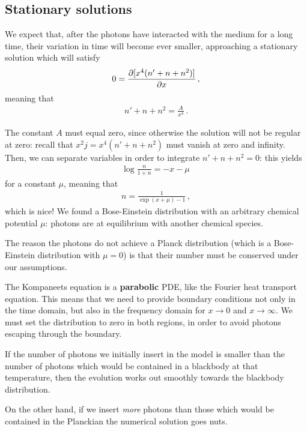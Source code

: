 \documentclass[main.tex]{subfiles}
\begin{document}
\subsection{Stationary solutions}

We expect that, after the photons have interacted with the medium for a long time, their variation in time will become ever smaller, approaching a stationary solution which will satisfy 
%
\begin{align}
0= \pdv{[x^{4} (n' + n + n^2)]}{x}
\,,
\end{align}
%
meaning that 
%
\begin{align}
n' + n + n^2 = \frac{A}{x^{4}}
\,.
\end{align}

The constant \(A\) must equal zero, since otherwise the solution will not be regular at zero: recall that \(x^2 j = x^{4 }( n' + n +n^2)\) must vanish at zero and infinity. 
Then, we can separate variables in order to integrate \(n' + n + n^2 = 0\): this yields 
%
\begin{align}
\log \frac{n}{1 + n} = - x - \mu    
\,
\end{align}
%
for a constant \(\mu \),
meaning that    
%
\begin{align}
n = \frac{1}{ \exp( x + \mu ) - 1}
\,,
\end{align}
%
which is nice!
We found a Bose-Einstein distribution with an arbitrary chemical potential \(\mu \): photons are at equilibrium with another chemical species. 

The reason the photons do not achieve a Planck distribution (which is a Bose-Einstein distribution with \(\mu = 0\)) is that their number must be conserved under our assumptions. 


The Kompaneets equation is a \textbf{parabolic} PDE, like the Fourier heat transport equation. 
This means that we need to provide boundary conditions not only in the time domain, but also in the frequency domain for \(x \to 0\) and \(x \to \infty \). We must set the distribution to zero in both regions, in order to avoid photons escaping through the boundary. 

If the number of photons we initially insert in the model is smaller than the number of photons which would be contained in a blackbody at that temperature, then the evolution works out smoothly towards the blackbody distribution.

On the other hand, if we insert \emph{more} photons than those which would be contained in the Planckian the numerical solution goes nuts. 
\end{document}
